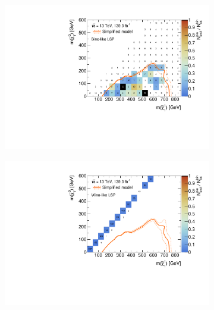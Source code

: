 \begin{figure}
	\centering
	\begin{subfigure}[b]{0.5\linewidth}
		\centering\includegraphics[width=\textwidth]{cut_bino_LSP/mchi1p_mlsp_contour}
	\end{subfigure}\hfill
	\begin{subfigure}[b]{0.5\linewidth}
		\centering\includegraphics[width=\textwidth]{cut_wino_LSP/mchi1p_mlsp_contour}
	\end{subfigure}\hfill
	

\end{figure}
